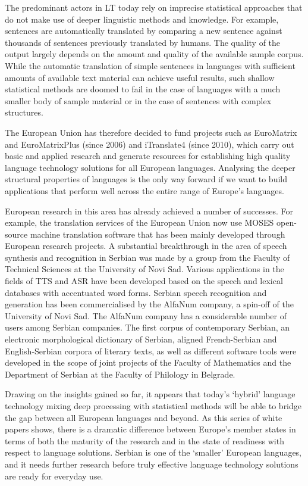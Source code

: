 {\begin{multicols}{2}
The predominant actors in LT today rely on imprecise statistical approaches that do not make use of deeper linguistic methods and knowledge. For example, sentences are automatically translated by comparing a new sentence against thousands of sentences previously translated by humans. The quality of the output largely depends on the amount and quality of the available sample corpus. While the automatic translation of simple sentences in languages with sufficient amounts of available text material can achieve useful results, such shallow statistical methods are doomed to fail in the case of languages with a much smaller body of sample material or in the case of sentences with complex structures.

The European Union has therefore decided to fund projects such as EuroMatrix and EuroMatrixPlus (since 2006) and iTranslate4 (since 2010), which carry out basic and applied research and generate resources for establishing high quality language technology solutions for all European languages. Analysing the deeper structural properties of languages is the only way forward if we want to build applications that perform well across the entire range of Europe’s languages.

European research in this area has already achieved a number of successes. For example, the translation services of the European Union now use MOSES open-source machine translation software that has been mainly developed through European research projects. A substantial breakthrough in the area of speech synthesis and recognition
in Serbian was
made by a group from the Faculty of Technical Sciences
at the University of Novi Sad.
Various applications in the fields of TTS and ASR
have been developed based on the speech and lexical databases with accentuated word forms. 
Serbian
speech recognition and generation has been commercialised
by the AlfaNum company, a spin-off of the University
of Novi Sad. The AlfaNum company has a considerable
number of users among Serbian companies.
The first
corpus of contemporary Serbian, an electronic
morphological dictionary of Serbian, aligned French-Serbian
and English-Serbian corpora of literary texts,
as well as different software tools 
were developed in the scope of joint projects 
of the Faculty of Mathematics
and the Department of Serbian at the
Faculty of Philology in Belgrade.


Drawing on the insights gained so far, it appears that today’s `hybrid' language technology mixing deep processing with statistical methods will be able to bridge the gap between all European languages and beyond. As this series of white papers shows, there is a dramatic difference between Europe's member states in terms of both the maturity of the research and in the state of readiness with respect to language solutions. Serbian is one of the ‘smaller’ European languages, and it needs further research before truly effective language technology solutions are ready for everyday use. 


\end{multicols}}
